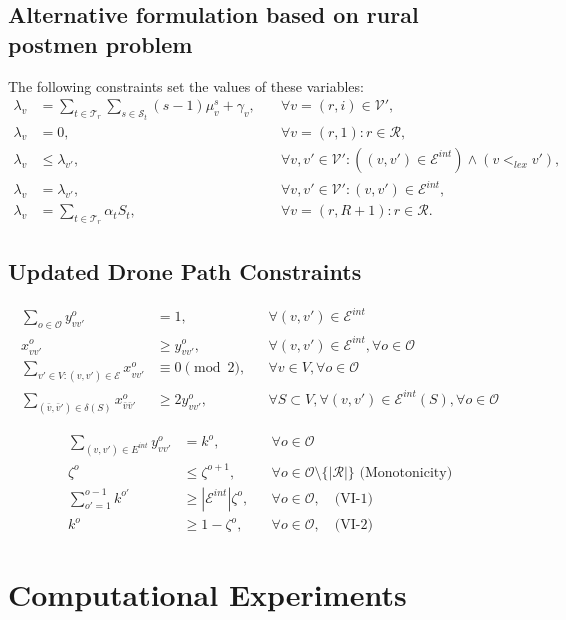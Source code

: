 \documentclass[12pt]{elsarticle}
\begin{document}
\subsection{Alternative formulation based on rural postmen problem}




The following constraints set the values of these variables:
\begin{align*}
    \lambda_{v}&=\sum_{t\in\mathcal T_r}\sum_{s\in\mathcal S_t}(s-1)\mu_{v}^s + \gamma_v,&\quad\forall v=(r,i)\in\mathcal V',\label{eq:location_4}\tag{$Loc-C_4$}\\
    \lambda_{v}&=0,&\quad\forall v=(r,1):r\in\mathcal R,\label{eq:location_5}\tag{$Loc-C_5$}\\
    \lambda_{v}&\leq \lambda_{v'},&\quad\forall v,v'\in\mathcal V':((v,v')\in \mathcal{E}^{int}) \wedge (v <_{lex} v') ,\label{eq:location_6}\tag{$Loc-C_6$}\\
    \lambda_{v}&= \lambda_{v'},&\quad\forall v,v'\in\mathcal V':(v,v')\in \mathcal{E}^{int},\label{eq:location_7}\tag{$Loc-C_7$}\\
    \lambda_{v}&=\sum_{t\in\mathcal T_r}\alpha_{t}S_t,&\quad\forall v=(r,R+1):r\in\mathcal R.\label{eq:location_8}\tag{$Loc-C_8$}
\end{align*}
\subsection{Updated Drone Path Constraints}

\begin{align*}
    \sum_{o \in \mathcal{O}} y_{vv'}^o &= 1, && \forall (v,v') \in \mathcal{E}^{int} \\
    x_{vv'}^o &\ge y_{vv'}^o, && \forall (v,v') \in \mathcal{E}^{int}, \forall o \in \mathcal{O} \\
    \sum_{v' \in V : (v,v') \in \mathcal{E}} x_{vv'}^o &\equiv 0 \pmod{2}, && \forall v \in V, \forall o \in \mathcal{O} \\
    \sum_{(\bar{v}, \bar{v}') \in \delta(S)} x_{\bar{v}\bar{v}'}^o &\ge 2y_{vv'}^o, && \forall S \subset V, \forall (v,v') \in \mathcal{E}^{int}(S), \forall o \in \mathcal{O}
\end{align*}



\begin{align*}
    \sum_{(v,v') \in E^{int}} y_{vv'}^o &= k^o, && \forall o \in \mathcal{O} \\
    \zeta^o &\le \zeta^{o+1}, && \forall o \in \mathcal{O} \setminus \{|\mathcal{R}|\} \text{ (Monotonicity)} \\
    \sum_{o'=1}^{o-1} k^{o'} &\ge |\mathcal{E}^{int}| \zeta^o, && \forall o \in \mathcal{O}, \quad \text{(VI-1)} \\
    k^o &\ge 1 - \zeta^o, && \forall o \in \mathcal{O}, \quad \text{(VI-2)}
\end{align*}

\section{Computational Experiments}



\newpage

\end{document}
